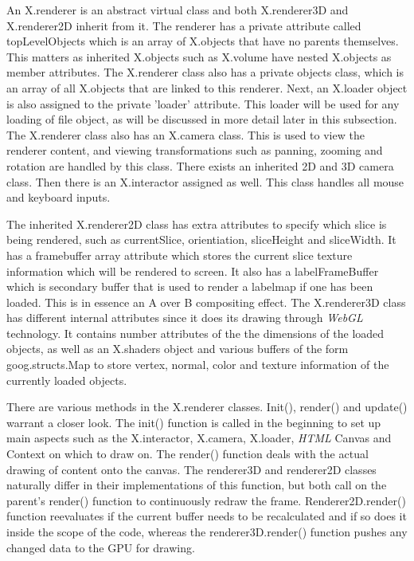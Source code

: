 \documentclass[a4paper,11pt,twoside]{article}
\begin{document}
An X.renderer is an abstract virtual class and both X.renderer3D and X.renderer2D inherit from it. The renderer has a private attribute called topLevelObjects which is an array of X.objects that have no parents themselves. This matters as inherited X.objects such as X.volume have nested X.objects as member attributes. The X.renderer class also has a private objects class, which is an array of all X.objects that are linked to this renderer. Next, an X.loader object is also assigned to the private 'loader' attribute. This loader will be used for any loading of file object, as will be discussed in more detail later in this subsection. The X.renderer class also has an X.camera class. This is used to view the renderer content, and viewing transformations such as panning, zooming and rotation are handled by this class. There exists an inherited 2D and 3D camera class. Then there is an X.interactor assigned as well. This class handles all mouse and keyboard inputs. 

The inherited X.renderer2D class has extra attributes to specify which slice is being rendered, such as currentSlice, orientiation, sliceHeight and sliceWidth. It has a framebuffer array attribute which stores the current slice texture information which will be rendered to screen. It also has a labelFrameBuffer which is secondary buffer that is used to render a labelmap if one has been loaded. This is in essence an A over B compositing effect. The X.renderer3D class has different internal attributes since it does its drawing through \textit{WebGL} technology. It contains number attributes of the the dimensions of the loaded objects, as well as an X.shaders object and various buffers of the form goog.structs.Map to store vertex, normal, color and texture information of the currently loaded objects.

There are various methods in the X.renderer classes. Init(), render() and update() warrant a closer look. The init() function is called in the beginning to set up main aspects such as the X.interactor, X.camera, X.loader, \textit{HTML} Canvas and Context on which to draw on. The render() function deals with the actual drawing of content onto the canvas. The renderer3D and renderer2D classes naturally differ in their implementations of this function, but both call on the parent's render() function to continuously redraw the frame. Renderer2D.render() function reevaluates if the current buffer needs to be recalculated and if so does it inside the scope of the code, whereas the renderer3D.render() function pushes any changed data to the GPU for drawing. 
\end{document}
